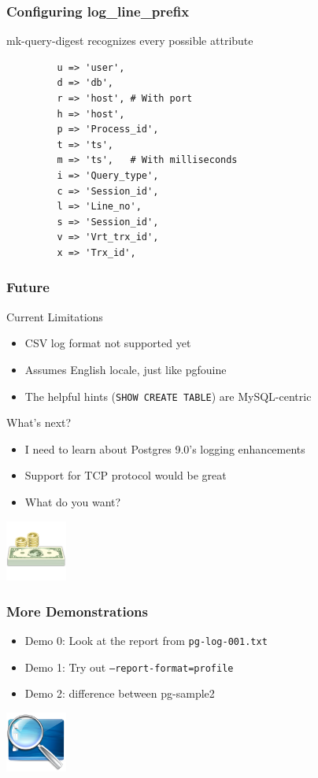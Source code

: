 \begin{frame}[fragile]
   \frametitle{Configuring log\_line\_prefix}
   mk-query-digest recognizes every possible attribute
         \begin{verbatim}
         u => 'user',
         d => 'db',
         r => 'host', # With port
         h => 'host',
         p => 'Process_id',
         t => 'ts',
         m => 'ts',   # With milliseconds
         i => 'Query_type',
         c => 'Session_id',
         l => 'Line_no',
         s => 'Session_id',
         v => 'Vrt_trx_id',
         x => 'Trx_id',
         \end{verbatim}
\end{frame}

\begin{frame}
   \frametitle{Future}
   \begin{block}{Current Limitations}
   \begin{itemize}
      \item CSV log format not supported yet
      \item Assumes English locale, just like pgfouine
      \item The helpful hints (\texttt{SHOW CREATE TABLE}) are MySQL-centric
   \end{itemize}
   \end{block}
   \begin{block}{What's next?}
   \begin{itemize}
      \item I need to learn about Postgres 9.0's logging enhancements
      \item Support for TCP protocol would be great
      \item What do you want?
   \end{itemize}
   \end{block}
   \includegraphics[width=20mm]{../image/money}
\end{frame}

\begin{frame}
   \frametitle{More Demonstrations}
   \begin{itemize}
      \item Demo 0: Look at the report from \texttt{pg-log-001.txt}
      \item Demo 1: Try out \texttt{--report-format=profile}
      \item Demo 2: difference between pg-sample2
   \end{itemize}
   \includegraphics[width=20mm]{../image/demo}
\end{frame}
